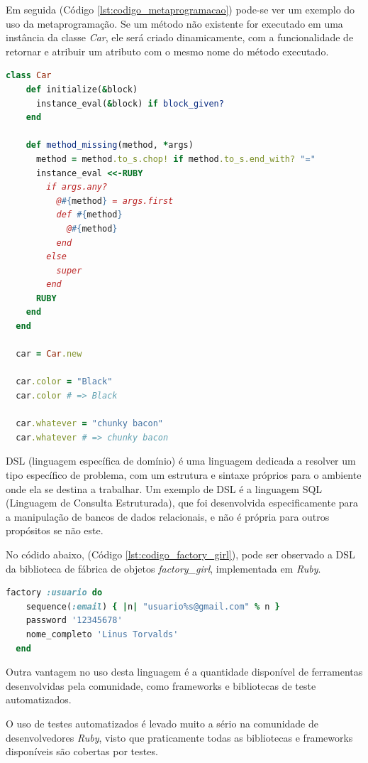 Em seguida (Código \ref{lst:codigo_metaprogramacao}) pode-se ver um exemplo do uso da metaprogramação. Se um método não existente for executado em uma instância da classe \textit{Car}, ele será criado dinamicamente, com a funcionalidade de retornar e atribuir um atributo com o mesmo nome do método executado.

{\singlespace
\begin{lstlisting}[caption=Metaprogramação em \textit{Ruby}, language=Ruby, label={lst:codigo_metaprogramacao}]
  class Car
    def initialize(&block)
      instance_eval(&block) if block_given?
    end

    def method_missing(method, *args)
      method = method.to_s.chop! if method.to_s.end_with? "="
      instance_eval <<-RUBY
        if args.any?
          @#{method} = args.first
          def #{method}
            @#{method}
          end
        else
          super
        end
      RUBY
    end
  end

  car = Car.new

  car.color = "Black"
  car.color # => Black

  car.whatever = "chunky bacon"
  car.whatever # => chunky bacon
\end{lstlisting}
}

DSL (linguagem específica de domínio) é uma linguagem dedicada a resolver um tipo específico de problema, com um estrutura e sintaxe próprios para o ambiente onde ela se destina a trabalhar. Um exemplo de DSL é a linguagem SQL (Linguagem de Consulta Estruturada), que foi desenvolvida especificamente para a manipulação de bancos de dados relacionais, e não é própria para outros propósitos se não este.

No códido abaixo, (Código \ref{lst:codigo_factory_girl}), pode ser observado a DSL da biblioteca de fábrica de objetos \textit{factory\_girl}, implementada em \textit{Ruby}.

{\singlespace
\begin{lstlisting}[caption=DSL da biblioteca \textit{factory\_girl}, language=Ruby, label={lst:codigo_factory_girl}]
  factory :usuario do
    sequence(:email) { |n| "usuario%s@gmail.com" % n }
    password '12345678'
    nome_completo 'Linus Torvalds'
  end
\end{lstlisting}
}

Outra vantagem no uso desta linguagem é a quantidade disponível de ferramentas desenvolvidas pela comunidade, como frameworks e bibliotecas de teste automatizados.

O uso de testes automatizados é levado muito a sério na comunidade de desenvolvedores \textit{Ruby}, visto que praticamente todas as bibliotecas e frameworks disponíveis são cobertas por testes.




